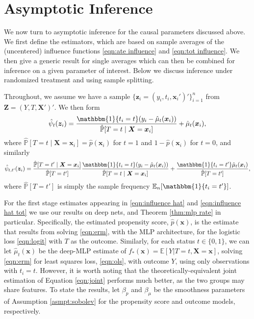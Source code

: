 \documentclass[11pt]{article}
\numberwithin{equation}{section}
\theoremstyle{definition}
\newcommand{\E}{\mathbb{E}}
\newcommand{\En}{\mathbb{E}_n}
\renewcommand{\P}{\mathbb{P}}
\newcommand{\One}{\mathbbm{1}}
\newcommand{\bz}{\bm{z}}
\newcommand{\bZ}{\bm{Z}}
\newcommand{\bx}{\bm{x}}
\newcommand{\bX}{\bm{X}}
\begin{document}
	

\section{Asymptotic Inference}
	\label{sec:inference}


We now turn to asymptotic inference for the causal parameters discussed above. We first define the estimators, which are based on sample averages of the (uncentered) influence functions \eqref{eqn:ate influence} and \eqref{eqn:tot influence}. We then give a generic result for single averages which can then be combined for inference on a given parameter of interest. Below we discuss inference under randomized treatment and using sample splitting. 

Throughout, we assume we have a sample $\{\bz_i = (y_i, t_i, \bx_i')'\}_{i=1}^n$ from $\bZ = (Y, T, \bX')'$. We then form
\begin{equation}
	\label{eqn:influence hat}
	\hat{\psi}_t(\bz_i) = \frac{ \One\{t_i = t\} ( y_i - \hat{\mu}_t(\bx_i)) }{\hat{\P}[T = t \mid \bX = \bx_i]}  +  \hat{\mu}_t(\bx_i),
\end{equation}
where $\hat{\P}[T = t \mid \bX = \bx_i] = \hat{p}(\bx_i)$ for $t=1$ and $1-\hat{p}(\bx_i)$ for $t=0$, and similarly
\begin{equation}
	\label{eqn:influence hat tot}
	\hat{\psi}_{t,t'}(\bz_i) =   \frac{\hat{\P}[T = t' \mid \bX = \bx_i]}{\hat{\P}[T = t']} \frac{  \One\{t_i = t\} ( y_i - \hat{\mu}_t(\bx_i)) }{\hat{\P}[T = t \mid \bX = \bx_i]}  +  \frac{\One\{t_i = t'\} \hat{\mu}_t(\bx_i)}{\hat{\P}[T = t']},
\end{equation}
where $\hat{\P}[T = t']$ is simply the sample frequency $\En[\One\{t_i = t'\}]$.

For the first stage estimates appearing in \eqref{eqn:influence hat} and \eqref{eqn:influence hat tot} we use our results on deep nets, and Theorem \ref{thm:mlp rate} in particular. Specifically, the estimated propensity score, $\hat{p}(\bx)$, is the estimate that results from solving \eqref{eqn:erm}, with the MLP architecture, for the logistic loss \eqref{eqn:logit} with $T$ as the outcome. Similarly, for each status $t \in \{0,1\}$, we can let $\hat{\mu}_t(\bx)$ be the deep-MLP estimate of $f_*(\bx) = \E[ Y | T = t, \bX = \bx]$, solving \eqref{eqn:erm} for least squares loss, \eqref{eqn:ols}, with outcome $Y$, using only observations with $t_i = t$. However, it is worth noting that the theoretically-equivalent joint estimation of Equation \eqref{eqn:joint} performs much better, as the two groups may share features. To state the results, let $\beta_p$ and $\beta_\mu$ be the smoothness parameters of Assumption \ref{asmpt:sobolev} for the propensity score and outcome models, respectively. 
\end{document}
